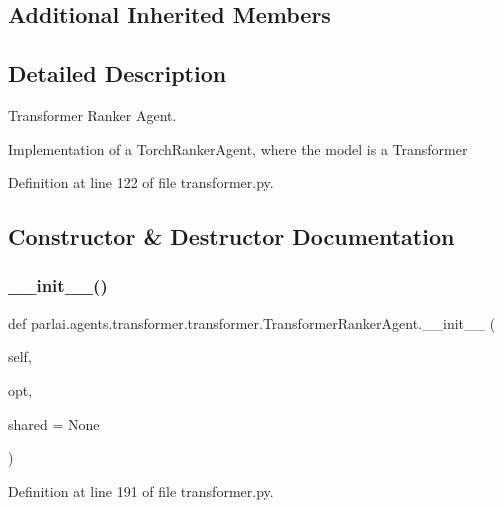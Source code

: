 \subsection*{Additional Inherited Members}


\subsection{Detailed Description}
\begin{DoxyVerb}Transformer Ranker Agent.

Implementation of a TorchRankerAgent, where the model is a Transformer
\end{DoxyVerb}
 

Definition at line 122 of file transformer.\+py.



\subsection{Constructor \& Destructor Documentation}
\mbox{\label{classparlai_1_1agents_1_1transformer_1_1transformer_1_1TransformerRankerAgent_a677c14e106614404f5c5f8605b90ce3e}} 
\subsubsection{\texorpdfstring{\+\_\+\+\_\+init\+\_\+\+\_\+()}{\_\_init\_\_()}}
{\footnotesize\ttfamily def parlai.\+agents.\+transformer.\+transformer.\+Transformer\+Ranker\+Agent.\+\_\+\+\_\+init\+\_\+\+\_\+ (\begin{DoxyParamCaption}\item[{}]{self,  }\item[{}]{opt,  }\item[{}]{shared = {\ttfamily None} }\end{DoxyParamCaption})}



Definition at line 191 of file transformer.\+py.


